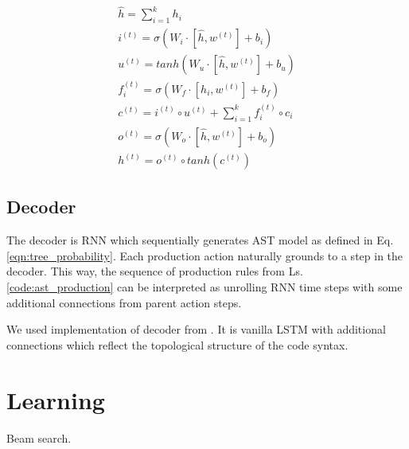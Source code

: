 \begin{equation}
\begin{gathered}
    \hat{h} = \sum^{k}_{i=1}h_i \\
    
    i^{(t)} = \sigma(W_i\cdot[\hat{h}, w^{(t)}]+b_i) \\
    
    u^{(t)} = tanh(W_u\cdot[\hat{h}, w^{(t)}]+b_u) \\
    
    f^{(t)}_i = \sigma(W_{f}\cdot [h_i, w^{(t)}] + b_f) \\
    
    c^{(t)} = i^{(t)} \circ u^{(t)} + \sum_{i=1}^{k} f^{(t)}_i \circ c_i \\
    
    o^{(t)} = \sigma(W_o\cdot[\hat{h}, w^{(t)}]+b_o) \\
    
    h^{(t)} = o^{(t)} \circ tanh(c^{(t)})

\end{gathered}
\label{eq:tree_lstm}
\end{equation}

\subsection{Decoder}
The decoder is RNN which sequentially generates AST model as defined in Eq. \ref{eqn:tree_probability}. Each production action naturally grounds to a step in the decoder. This way, the sequence of production rules from Ls. \ref{code:ast_production} can be interpreted as unrolling RNN time steps with some additional connections from parent action steps.

We used implementation of decoder from \cite{Yin2017}. It is vanilla LSTM with additional connections which reflect the topological structure of the code syntax. 

\section{Learning}
Beam search.
